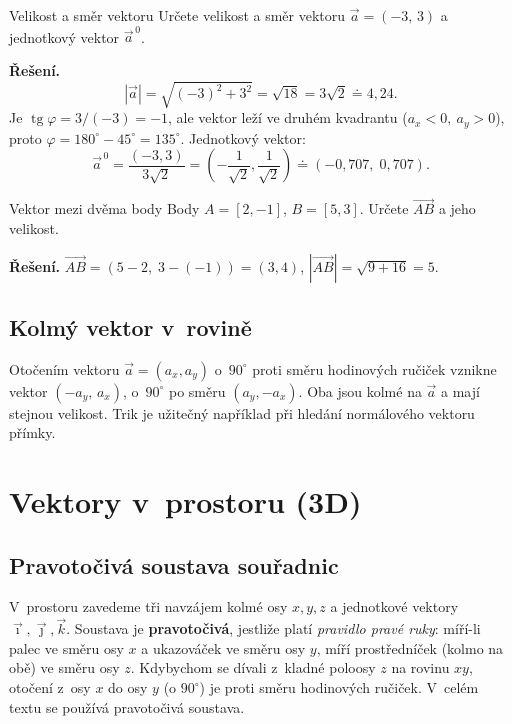\documentclass[a4paper,11pt]{article}
\newcommand{\abs}[1]{\left\lvert #1\right\rvert}
\newcommand{\ii}{\vec{\imath}}
\newcommand{\jj}{\vec{\jmath}}
\newcommand{\kk}{\vec{k}}
\newcommand{\dc}{{,}}                    %
\begin{document}
\begin{priklad}{Velikost a směr vektoru}
Určete velikost a směr vektoru $\vec a=(-3,\,3)$ a jednotkový vektor $\vec a^{\,0}$.

\medskip\noindent\textbf{Řešení.}
\[
  \abs{\vec a}=\sqrt{(-3)^2+3^2}=\sqrt{18}=3\sqrt2\doteq4\dc24 .
\]
Je $\operatorname{tg}\varphi=3/(-3)=-1$, ale vektor leží ve druhém kvadrantu
($a_x<0,\ a_y>0$), proto $\varphi=180^\circ-45^\circ=135^\circ$.
Jednotkový vektor:
\[
  \vec a^{\,0}=\frac{(-3,3)}{3\sqrt2}=\left(-\frac{1}{\sqrt2},\frac{1}{\sqrt2}\right)
  \doteq(-0\dc707,\;0\dc707).
\]
\end{priklad}

\begin{priklad}{Vektor mezi dvěma body}
Body $A=[2,-1]$, $B=[5,3]$. Určete $\overrightarrow{AB}$ a jeho velikost.

\medskip\noindent\textbf{Řešení.}
$\overrightarrow{AB}=(5-2,\;3-(-1))=(3,4)$, $\abs{\overrightarrow{AB}}=\sqrt{9+16}=5$.
\end{priklad}

\subsection{Kolmý vektor v~rovině}

Otočením vektoru $\vec a=(a_x,a_y)$ o~$90^\circ$ proti směru hodinových ručiček
vznikne vektor $(-a_y,\,a_x)$, o~$90^\circ$ po směru $(a_y,-a_x)$. Oba jsou kolmé na
$\vec a$ a mají stejnou velikost. Trik je užitečný například při hledání normálového
vektoru přímky.

\section{Vektory v~prostoru (3D)}

\subsection{Pravotočivá soustava souřadnic}

V~prostoru zavedeme tři navzájem kolmé osy $x,y,z$ a jednotkové vektory
$\ii,\jj,\kk$. Soustava je \textbf{pravotočivá}, jestliže platí \emph{pravidlo pravé ruky}:
míří-li palec ve směru osy $x$ a ukazováček ve směru osy $y$, míří prostředníček
(kolmo na obě) ve směru osy $z$. Kdybychom se dívali z~kladné poloosy $z$ na
rovinu $xy$, otočení z~osy $x$ do osy $y$ (o $90^\circ$) je proti směru hodinových
ručiček. V~celém textu se používá pravotočivá soustava.
\end{document}
